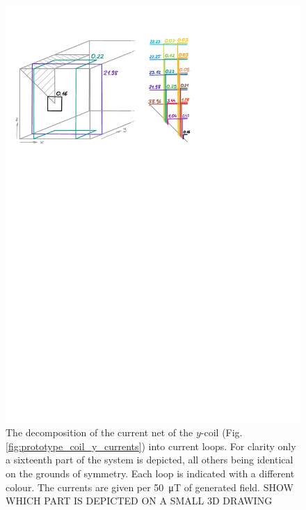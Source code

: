 \begin{figure}
  \centering
  \includegraphics[width=0.9\linewidth]{gfx/prototype/coil_y_decomposition.pdf}
  \caption{The decomposition of the current net of the $y$-coil (Fig.\,\ref{fig:prototype_coil_y_currents}) into current loops. For clarity only a sixteenth part of the system is depicted, all others being identical on the grounds of symmetry. Each loop is indicated with a different colour. The currents are given per \SI{50}{\micro\tesla} of generated field. SHOW WHICH PART IS DEPICTED ON A SMALL 3D DRAWING}
  \label{fig:prototype_coil_y_decomposition}
\end{figure}

